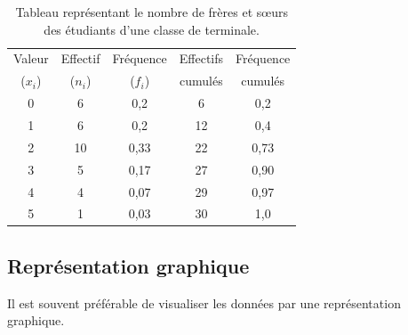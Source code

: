 \begin{defi}
\begin{ex}
                        \begin{table}[H]
                        \centering
                        \begin{tabular}{c|c|c|c|c}
                        Valeur   & Effectif & Fr\'equence & Effectifs & Fr\'equence \\
                        ($x_i$)  & ($n_i$)  &  ($f_i$)    & cumul\'es &  cumul\'es  \\
                        \hline
                              0        &       6          &       0,2           &       6             &         0,2           \\
                              1        &       6          &       0,2           &      12             &         0,4           \\
                              2        &      10          &       0,33          &      22             &         0,73          \\
                              3        &       5          &       0,17          &      27             &         0,90          \\
                              4        &       4          &       0,07          &      29             &         0,97          \\
                              5        &       1          &       0,03          &      30             &         1,0           \\
                        \end{tabular}
                        \caption{Tableau repr\'esentant le
                                 nombre de fr\`eres et s\oe urs des \'etudiants d'une classe de terminale.}
                        \label{tab:variable discret}
                        \end{table}
                  \end{ex}
            \end{defi}
            \subsection{Repr\'esentation graphique}
                  Il est souvent pr\'ef\'erable de visualiser les donn\'ees par une repr\'esentation graphique.
